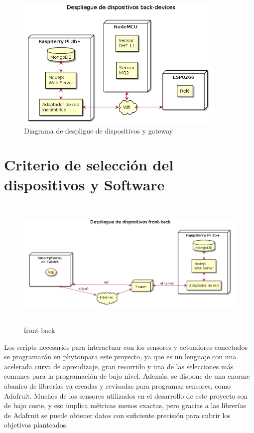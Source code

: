 \begin{figure}[hbt!]
\centering
\includegraphics[height=2.5in]{figures/diagrams/physical-devices/back-devices.png}
\caption[Diagrama de despligue de back-end]{Diagrama de despligue de dispositivos y gateway\footnotemark}
\end{figure}

\section{Criterio de selección del dispositivos y Software}
\label{makereference4.3}

\begin{figure}[hbt!]
\centering
\includegraphics[height=2.5in]{figures/diagrams/physical-devices/front-back.png}
\caption[front-back]{front-back\footnotemark}
\end{figure}

Los scripts necesarios para interactuar con los sensores y actuadores conectados se programarán en \gls{phyton}para este proyecto, ya que es un lenguaje con una acelerada curva de aprendizaje, gran recorrido y una de las selecciones más comunes para la programación de bajo nivel. Además, se dispone de una enorme abanico de librerías ya creadas y revisadas para programar sensores, como Adafruit. Muchos de los sensores utilizados en el desarrollo de este proyecto son de bajo coste, y eso implica métricas menos exactas, pero gracias a las librerías de Adafruit se puede obtener datos con suficiente precisión para cubrir los objetivos planteados.


